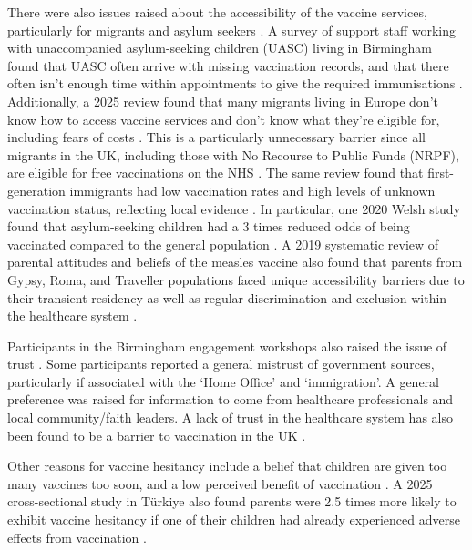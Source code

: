 \documentclass{article}
\begin{document}
There were also issues raised about the accessibility of the vaccine services, particularly for migrants and asylum seekers
\cite{bissett_measles_soft_intelligence_2024}. A survey of support staff working with unaccompanied asylum-seeking children (UASC) living in Birmingham found that UASC often arrive with missing vaccination records, and that there often isn’t enough time within appointments to give the required immunisations \cite{kemishi_uasc_health_wellbeing_2025}. Additionally, a 2025 review found that many migrants living in Europe don’t know how to access vaccine services and don’t know what they’re eligible for, including fears of costs \cite{halliday2025vaccine}. This is a particularly unnecessary barrier since all migrants in the UK, including those with No Recourse to Public Funds (NRPF), are eligible for free vaccinations on the NHS \cite{nrpf_nhs_treatment_overview, ukhsa_migrant_immunisation_2022}. The same review found that first-generation immigrants had low vaccination rates and high levels of unknown vaccination status, reflecting local evidence \cite{halliday2025vaccine}. In particular, one 2020 Welsh study found that asylum-seeking children had a 3 times reduced odds of being vaccinated compared to the general population \cite{perry2020inequalities}. A 2019 systematic review of parental attitudes and beliefs of the measles vaccine also found that parents from Gypsy, Roma, and Traveller populations faced unique accessibility barriers due to their transient residency as well as regular discrimination and exclusion within the healthcare system \cite{wilder2020resurgence}.

Participants in the Birmingham engagement workshops also raised the issue of trust \cite{bissett_measles_soft_intelligence_2024, palmer_birmingham_measles_engagement_2024}. Some participants reported a general mistrust of government sources, particularly if associated with the ‘Home Office’ and ‘immigration’. A general preference was raised for information to come from healthcare professionals and local community/faith leaders. A lack of trust in the healthcare system has also been found to be a barrier to vaccination in the UK \cite{torracinta2021mmr}.

Other reasons for vaccine hesitancy include a belief that children are given too many vaccines too soon, and a low perceived benefit of vaccination \cite{novilla2023parents}. A 2025 cross-sectional study in Türkiye also found parents were 2.5 times more likely to exhibit vaccine hesitancy if one of their children had already experienced adverse effects from vaccination \cite{komurluouglu2025vaccine}.
\end{document}
